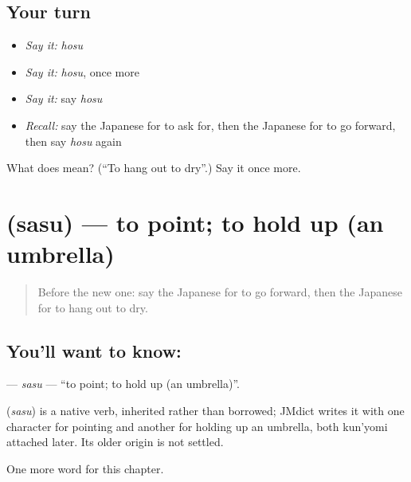 \subsection*{Your turn}
\begin{itemize}
\raggedright
  \item \emph{Say it:} \emph{hosu}
  \item \emph{Say it:} \emph{hosu}, once more
  \item \emph{Say it:} say \emph{hosu}
  \item \emph{Recall:} say the Japanese for to ask for, then the Japanese for to go forward, then say \emph{hosu} again
\end{itemize}

\begin{tcolorbox}[breakable,colback=teal!4,colframe=teal!35!black,title={Before you move on}]
What does  mean? (\textquotedblleft{}To hang out to dry\textquotedblright{}.) Say it once more.
\end{tcolorbox}
\section[\texorpdfstring{\ja{さす} (sasu)}{さす (sasu)}]{ (sasu) — to point; to hold up (an umbrella)}

\label{lesson:JA-C87-sasu}



\begin{quote}
Before the new one: say the Japanese for to go forward, then the Japanese for to hang out to dry.
\end{quote}

\subsection*{You'll want to know: }
\textbf{} — \emph{sasu} — \textquotedblleft{}to point; to hold up (an umbrella)\textquotedblright{}.

\begin{cousinweb}
\textbf{} (\emph{sasu}) is a native verb, inherited rather than borrowed; JMdict writes it with one character for pointing and another for holding up an umbrella, both kun'yomi attached later. Its older origin is not settled.
\end{cousinweb}

\begin{grammarlens}[title={What you've built}]
One more word for this chapter.
\end{grammarlens}

